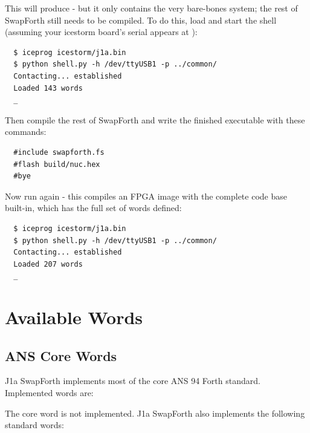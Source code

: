 \noindent
This will produce  - but it only contains the very bare-bones system;
the rest of SwapForth still needs to be compiled.
To do this, load  and start the shell
(assuming your icestorm board's serial appears at ):

\begin{framed}
\begin{Verbatim}
  $ iceprog icestorm/j1a.bin
  $ python shell.py -h /dev/ttyUSB1 -p ../common/
  Contacting... established
  Loaded 143 words
  _
\end{Verbatim}
\end{framed}

Then compile the rest of SwapForth and write the finished executable with these commands:

\begin{framed}
\begin{Verbatim}
  #include swapforth.fs
  #flash build/nuc.hex
  #bye
\end{Verbatim}
\end{framed}

Now run  again - this compiles an FPGA image with the complete code base built-in,
which has the full set of words defined:

\begin{framed}
\begin{Verbatim}
  $ iceprog icestorm/j1a.bin
  $ python shell.py -h /dev/ttyUSB1 -p ../common/
  Contacting... established
  Loaded 207 words
  _
\end{Verbatim}
\end{framed}


\chapter{Available Words}

\section{ANS Core Words} 

J1a SwapForth implements most of the core ANS 94 Forth standard.
Implemented words are:



\noindent
The core word
is not implemented.
J1a SwapForth also implements the following standard words:

